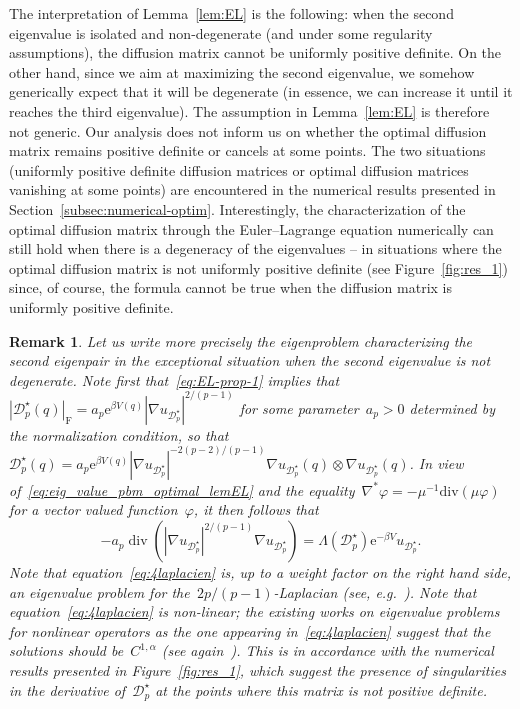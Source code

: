 \documentclass{article}
\newtheorem{remark}{Remark}
\newcommand{\rme}{\mathrm{e}}
\newcommand{\Diff}{\mathcal{D}}
\newcommand{\F}{\mathrm{F}}
\newcommand{\normF}[1]{\left| #1 \right|_{\F}}
\begin{document}
The interpretation of Lemma~\ref{lem:EL} is the following: when the second eigenvalue is isolated and non-degenerate (and under some regularity assumptions), the diffusion matrix cannot be uniformly positive definite. On the other hand, since we aim at maximizing the second eigenvalue, we somehow generically expect that it will be degenerate (in essence, we can increase it until it reaches the third eigenvalue). The assumption in Lemma~\ref{lem:EL} is therefore not generic. Our analysis does not inform us on whether the optimal diffusion matrix remains positive definite or cancels at some points. The two situations (uniformly positive definite diffusion matrices or optimal diffusion matrices vanishing at some points) are encountered in the numerical results presented in Section~\ref{subsec:numerical-optim}. Interestingly, the characterization of the optimal diffusion matrix through the Euler--Lagrange equation numerically can still hold when there is a degeneracy of the eigenvalues -- in situations where the optimal diffusion matrix is not uniformly positive definite (see Figure~\ref{fig:res_1}) since, of course, the formula cannot be true when the diffusion matrix is uniformly positive definite.

\begin{remark}
  \label{rmk:p_laplacian}
  Let us write more precisely the eigenproblem characterizing the second eigenpair in the exceptional situation when the second eigenvalue is not degenerate. Note first that~\eqref{eq:EL-prop-1} implies that~$\normF{\Diff^\star_p(q)} = a_p \rme^{\beta V(q)}|\nabla u_{\Diff^{\star}_p}|^{2/(p-1)}$ for some parameter~$a_p>0$ determined by the normalization condition, so that~$\Diff^\star_p(q) = a_p \rme^{\beta V(q)} |\nabla u_{\Diff^{\star}_p}|^{-2(p-2)/(p-1)} \nabla u_{\Diff^{\star}_p}(q)\otimes \nabla u_{\Diff^{\star}_p}(q)$. In view of~\eqref{eq:eig_value_pbm_optimal_lemEL} and the equality~$\nabla^* \varphi = -\mu^{-1} \mathrm{div} (\mu \varphi)$ for a vector valued function~$\varphi$, it then follows that
  \begin{equation}
    \label{eq:4laplacien}
    -a_p \operatorname{div}\left(|\nabla u_{\Diff^{\star}_p}|^{2/(p-1)} \nabla u_{\Diff^{\star}_p}\right) = \Lambda(\Diff^{\star}_p)\rme^{-\beta V} u_{\Diff^{\star}_p}.
  \end{equation}
  Note that equation~\eqref{eq:4laplacien} is, up to a weight factor on the right hand side, an eigenvalue problem for the~$2p/(p-1)$-Laplacian (see, e.g.~\cite{pLaplacien}). %
  Note that equation~\eqref{eq:4laplacien} is non-linear; the existing works on eigenvalue problems for nonlinear operators as the one appearing in~\eqref{eq:4laplacien} suggest that the solutions should be~$C^{1,\alpha}$ (see again~\cite{pLaplacien}). This is in accordance with the numerical results presented in Figure~\ref{fig:res_1}, which suggest the presence of singularities in the derivative of~$\Diff^{\star}_p$ at the points where this matrix is not positive definite. 
\end{remark}
\end{document}
